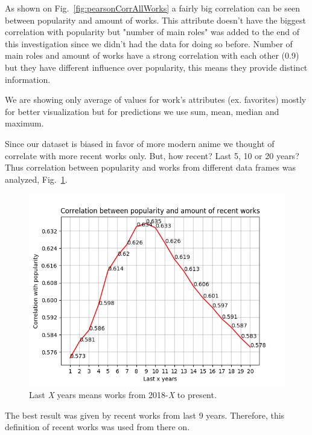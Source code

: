 As shown on Fig.~\ref{fig:pearsonCorrAllWorks} a fairly big correlation can be seen between popularity and amount of works. This attribute doesn't have the biggest correlation with popularity but "number of main roles" was added to the end of this investigation since we didn't had the data for doing so before. Number of main roles and amount of works have a strong correlation with each other (0.9) but they have different influence over popularity, this means they provide distinct information.

We are showing only average of values for work's attributes (ex. favorites) mostly for better visualization but for predictions we use sum, mean, median and maximum.

Since our dataset is biased in favor of more modern anime we thought of correlate with more recent works only. But, how recent? Last 5, 10 or 20 years? Thus correlation between popularity and works from different data frames was analyzed, Fig.~\ref{fig:correlationPopRecentWorks}.

\begin{figure}[!h]
	\begin{center}
	\includegraphics[width=\columnwidth]{graphics/correlationPopRecentWorks.png}
	\caption{Last \textit{X} years means works from 2018-\textit{X} to present.}
	\label{fig:correlationPopRecentWorks}
	\end{center}
\end{figure}

The best result was given by recent works from last 9 years. Therefore, this definition of recent works was used from there on.

